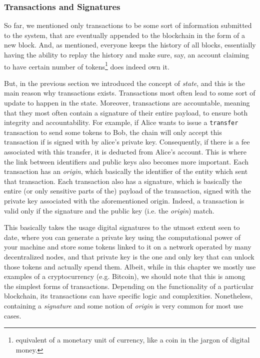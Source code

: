 \subsubsection{Transactions and Signatures} \label{chap_bg:subsec:transaction_sig}

So far, we mentioned only transactions to be some sort of information submitted to the system, that
are eventually appended to the blockchain in the form of a new block. And, as mentioned, everyone
keeps the history of all blocks, essentially having the ability to replay the history and make sure,
say, an account claiming to have certain number of tokens\footnote{equivalent of a monetary unit of
currency, like a coin in the jargon of digital money.} does indeed own it.

But, in the previous section we introduced the concept of \textit{state}, and this is the main
reason why transactions exists. Transactions most often lead to some sort of update to happen in the
state. Moreover, transactions are accountable, meaning that they most often contain a signature of
their entire payload, to ensure both integrity and accountability. For example, if Alice wants to
issue a \texttt{transfer} transaction to send some tokens to Bob, the chain will only accept this
transaction if is signed with by alice's private key. Consequently, if there is a fee associated
with this transfer, it is deducted from Alice's account. This is where the link between identifiers
and public keys also becomes more important. Each transaction has an \textit{origin}, which
basically the identifier of the entity which sent that transaction. Each transaction also has a
signature, which is basically the entire (or only sensitive parts of the) payload of the
transaction, signed with the private key associated with the aforementioned origin. Indeed, a
transaction is valid only if the signature and the public key (i.e. the \textit{origin}) match.

This basically takes the usage digital signatures to the utmost extent seen to date, where you can
generate a private key using the computational power of your machine and store some tokens linked to
it on a network operated by many decentralized nodes, and that private key is the one and only key
that can unlock those tokens and actually spend them. Albeit, while in this chapter we mostly use
examples of a cryptocurrency (e.g. Bitcoin), we should note that this is among the simplest forms of
transactions. Depending on the functionality of a particular blockchain, its transactions can have
specific logic and complexities. Nonetheless, containing a \textit{signature} and some notion of
\textit{origin} is very common for most use cases.

